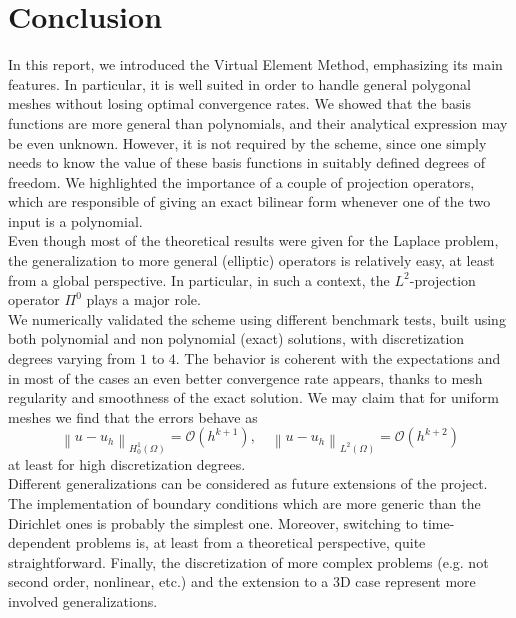 \documentclass[10pt]{article}
\newcommand{\norm}[2]{\left\lVert#1\right\rVert_{#2}}
\begin{document}
\section{Conclusion} \label{sec:conclusion}
In this report, we introduced the Virtual Element Method, emphasizing its main features. In particular, it is well suited in order to handle general polygonal meshes without losing optimal convergence rates. We showed that the basis functions are more general than polynomials, and their analytical expression may be even unknown. However, it is not required by the scheme, since one simply needs to know the value of these basis functions in suitably defined degrees of freedom. We highlighted the importance of a couple of projection operators, which are responsible of giving an exact bilinear form whenever one of the two input is a polynomial. \\
Even though most of the theoretical results were given for the Laplace problem, the generalization to more general (elliptic) operators is relatively easy, at least from a global perspective. In particular, in such a context, the $L^2$-projection operator $\Pi^0$ plays a major role. \\
We numerically validated the scheme using different benchmark tests, built using both polynomial and non polynomial (exact) solutions, with discretization degrees varying from $1$ to $4$. The behavior is coherent with the expectations and in most of the cases an even better convergence rate appears, thanks to mesh regularity and smoothness of the exact solution. We may claim that for uniform meshes we find that the errors behave as
$$\norm{u-u_h}{H^1_0(\Omega)}=\mathcal{O}(h^{k+1}), \quad \norm{u-u_h}{L^2(\Omega)}=\mathcal{O}(h^{k+2})$$
at least for high discretization degrees. \\
Different generalizations can be considered as future extensions of the project. The implementation of boundary conditions which are more generic than the Dirichlet ones is probably the simplest one. Moreover, switching to time-dependent problems is, at least from a theoretical perspective, quite straightforward. Finally, the discretization of more complex problems (e.g. not second order, nonlinear, etc.) and the extension to a 3D case represent more involved generalizations.
\end{document}
